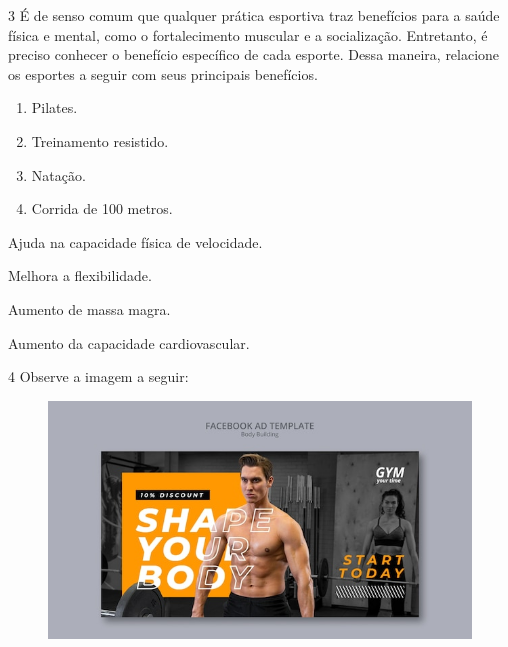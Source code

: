 
\num{3} É de senso comum que qualquer prática esportiva traz benefícios 
para a saúde física e mental, como o fortalecimento muscular e a
socialização. Entretanto, é preciso conhecer o benefício específico de
cada esporte. Dessa maneira, relacione os esportes a seguir com seus 
principais benefícios.

\begin{enumerate}
\item Pilates.

\item Treinamento resistido.

\item Natação.

\item Corrida de 100 metros.
\end{enumerate}

\begin{boxlist}
 Ajuda na capacidade física de velocidade.

 Melhora a flexibilidade.

 Aumento de massa magra.

 Aumento da capacidade cardiovascular.
\end{boxlist}


\pagebreak
\num{4}  Observe a imagem a seguir:

\begin{figure}[htpb!]
\centering
\includegraphics[width=\textwidth]{./imgs/img4.jpg}
\end{figure}

